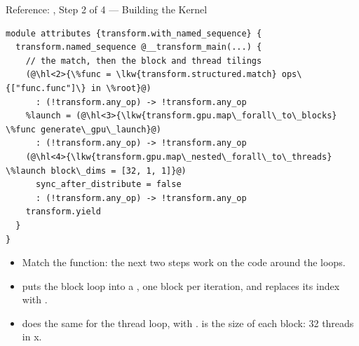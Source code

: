\documentclass[aspectratio=169,10pt]{beamer}
\begin{document}
\begin{frame}[fragile]{Reference: , Step 2 of 4 --- Building the Kernel}
\begin{lstlisting}[language=mlir]
module attributes {transform.with_named_sequence} {
  transform.named_sequence @__transform_main(...) {
    // the match, then the block and thread tilings
    (@\hl<2>{\%func = \lkw{transform.structured.match} ops\{["func.func"]\} in \%root}@)
      : (!transform.any_op) -> !transform.any_op
    %launch = (@\hl<3>{\lkw{transform.gpu.map\_forall\_to\_blocks} \%func generate\_gpu\_launch}@)
      : (!transform.any_op) -> !transform.any_op
    (@\hl<4>{\lkw{transform.gpu.map\_nested\_forall\_to\_threads} \%launch block\_dims = [32, 1, 1]}@)
      sync_after_distribute = false
      : (!transform.any_op) -> !transform.any_op
    transform.yield
  }
}
\end{lstlisting}
  \vspace{0.3em}
  \begin{itemize}
    \item<2-> Match the function: the next two steps work on the code around
      the loops.
    \item<3->  puts the block loop into a
      , one block per iteration, and replaces its index with
      .
    \item<4->  does the same for the
      thread loop, with .  is the size of
      each block: 32 threads in x.
  \end{itemize}
\end{frame}
\end{document}

